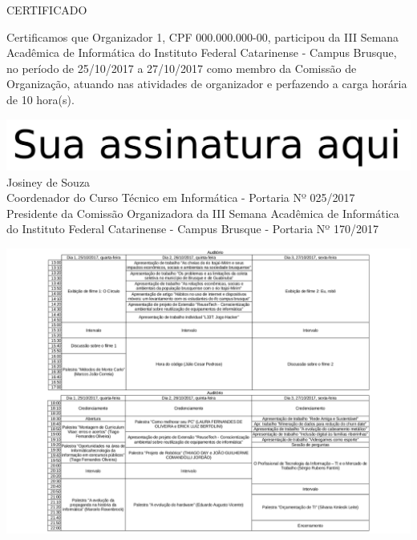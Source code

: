 \documentclass{abnt}
\begin{document}
\BgThispage
\color{black}
\bf
\begin{center}
    \Huge{CERTIFICADO}
\end{center}

Certificamos que Organizador 1, CPF 000.000.000-00, participou da III Semana Acadêmica de Informática do Instituto Federal Catarinense - Campus Brusque, no período de
25/10/2017 a 27/10/2017 como membro da Comissão de Organização, atuando nas atividades de organizador e perfazendo a
carga horária de 10 hora(s).


\begin{center}
\includegraphics[scale=0.2]{../assinatura-pb.png}\\
Josiney de Souza\\
Coordenador do Curso Técnico em Informática - Portaria Nº 025/2017\\
Presidente da Comissão Organizadora da III Semana Acadêmica de Informática do Instituto Federal Catarinense - Campus Brusque - Portaria Nº 170/2017
\end{center}

\newpage
{}

\includegraphics[scale=0.85]{../juncao-grades.png}
\end{document}
